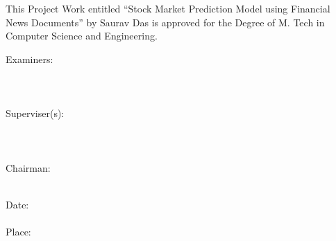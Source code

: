 \documentclass[a4paper,12bp]{report}
\begin{document}
\Large {
This Project Work entitled ``Stock Market Prediction Model using Financial News Documents''  by Saurav Das is approved for the Degree of M. Tech in Computer Science and Engineering.
\begin{center}
Examiners:\\
\underline{\hspace{6cm}}\\
\vspace{5mm}
\underline{\hspace{6cm}}\\
\vspace{5mm}
\underline{\hspace{6cm}}\\

\vspace{15mm}
Superviser(s):\\
\underline{\hspace{6cm}}\\
\vspace{5mm}
\underline{\hspace{6cm}}\\
\vspace{5mm}
\underline{\hspace{6cm}}\\
\vspace{15mm}
Chairman:\\
\underline{\hspace{6cm}}\\
\end{center}
\vspace{15mm}
Date: \underline{\hspace{6cm}}\\
\\ 
Place:\underline{\hspace{6cm}}\\
}
\end{document}
